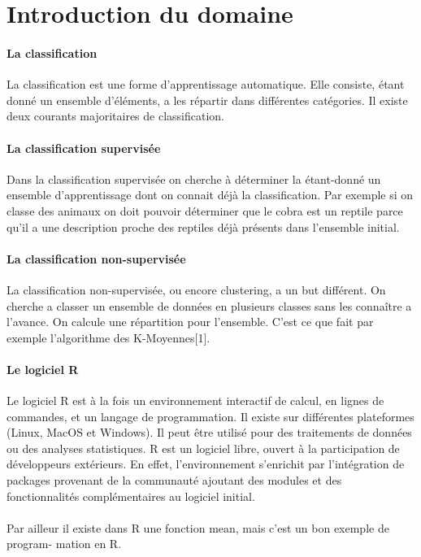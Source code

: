 \section{Introduction du domaine}
\paragraph{La classification}

La classification est une forme d’apprentissage automatique. Elle consiste,
étant donné un ensemble d’éléments, a les répartir dans différentes catégories. Il existe
deux courants majoritaires de classification.

\paragraph{La classification supervisée}


Dans la classification supervisée on cherche à déterminer la
étant-donné un ensemble d’apprentissage dont on connait déjà la classification. Par
exemple si on classe des animaux on doit pouvoir déterminer que le cobra est un
reptile parce qu’il a une description proche des reptiles déjà présents dans l’ensemble
initial.

\paragraph{La classification non-supervisée}

La classification non-supervisée, ou encore clustering, a un but différent. On
cherche a classer un ensemble de données en plusieurs classes sans les connaître a
l’avance. On calcule une répartition pour l’ensemble. C’est ce que fait par exemple
l’algorithme des K-Moyennes[1].

\paragraph{Le logiciel R}

Le logiciel R est à la fois un environnement interactif de calcul, en lignes de
commandes, et un langage de programmation. Il existe sur différentes plateformes
(Linux, MacOS et Windows). Il peut être utilisé pour des traitements de données
ou des analyses statistiques. R est un logiciel libre, ouvert à la participation de
développeurs extérieurs. En effet, l’environnement s’enrichit par l’intégration de
packages provenant de la communauté ajoutant des modules et des fonctionnalités
complémentaires au logiciel initial.\\\\

Par ailleur il existe dans R une fonction mean, mais c’est un bon exemple de program-
mation en R.
\newpage